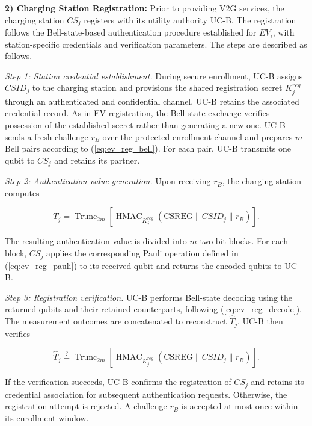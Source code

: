 \documentclass[twocolumn,10pt,journal]{IEEEtran}
\begin{document}
\noindent\textbf{2) Charging Station Registration:}
Prior to providing V2G services, the charging station
$CS_j$ registers with its utility authority UC-B.
The registration follows the Bell-state-based authentication
procedure established for $EV_i$, with station-specific
credentials and verification parameters. The steps are
described as follows.

\textit{Step 1: Station credential establishment.}
During secure enrollment, UC-B assigns $CSID_j$ to the
charging station and provisions the shared registration secret
$K_j^{reg}$ through an authenticated and confidential channel.
UC-B retains the associated credential record. As in EV
registration, the Bell-state exchange verifies possession
of the established secret rather than generating a new one.
UC-B sends a fresh challenge $r_B$ over the protected enrollment
channel and prepares $m$ Bell
pairs according to (\ref{eq:ev_reg_bell}). For each pair,
UC-B transmits one qubit to $CS_j$ and retains its partner.

\textit{Step 2: Authentication value generation.}
Upon receiving $r_B$, the charging station computes

\begin{equation}
T_j =
\operatorname{Trunc}_{2m}
\left[
\operatorname{HMAC}_{K_j^{reg}}
\left(
\mathrm{CSREG}\parallel CSID_j\parallel r_B
\right)
\right].
\label{eq:cs_reg_auth}
\end{equation}

The resulting authentication value is divided into
$m$ two-bit blocks. For each block, $CS_j$ applies
the corresponding Pauli operation defined in
(\ref{eq:ev_reg_pauli}) to its received qubit and
returns the encoded qubits to UC-B.

\textit{Step 3: Registration verification.}
UC-B performs Bell-state decoding using the returned
qubits and their retained counterparts, following
(\ref{eq:ev_reg_decode}). The measurement outcomes
are concatenated to reconstruct $\widehat{T}_j$.
UC-B then verifies

\begin{equation}
\widehat{T}_j
\stackrel{?}{=}
\operatorname{Trunc}_{2m}
\left[
\operatorname{HMAC}_{K_j^{reg}}
\left(
\mathrm{CSREG}\parallel CSID_j\parallel r_B
\right)
\right].
\label{eq:cs_reg_verify}
\end{equation}

If the verification succeeds, UC-B confirms the
registration of $CS_j$ and retains its credential
association for subsequent authentication requests.
Otherwise, the registration attempt is rejected. A challenge
$r_B$ is accepted at most once within its enrollment window.
\end{document}
